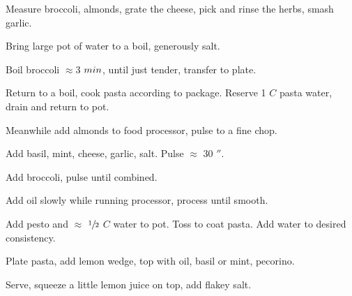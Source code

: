\begin{preparation}
\item Measure broccoli, almonds, grate the cheese, pick and rinse the herbs, smash garlic.
\item Bring large pot of water to a boil, generously salt.
\item Boil broccoli $\approx3$ $\minute$, until just tender, transfer to plate.
\item Return to a boil, cook pasta according to package.
    Reserve 1 $C$ pasta water, drain and return to pot.
\item Meanwhile add almonds to food processor, pulse to a fine chop.
\item Add basil, mint, cheese, garlic, salt.
    Pulse $\approx$ $30$ $\second$.
\item Add broccoli, pulse until combined.
\item Add oil slowly while running processor, process until smooth.
\item Add pesto and $\approx$ $\onehalf$ $C$ water to pot.
    Toss to coat pasta.
    Add water to desired consistency.
\item Plate pasta, add lemon wedge, top with oil, basil or mint, pecorino.
\item Serve, squeeze a little lemon juice on top, add flakey salt.
\end{preparation}

\recipeend%
